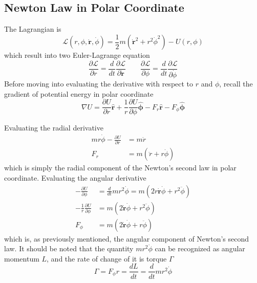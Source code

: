 \documentclass[../../../main.tex]{subfiles}
\begin{document}
\subsection{Newton Law in Polar Coordinate}
The Lagrangian is
\begin{equation*}
	\mathcal{L}(r,\phi,\dot{\mathbf{r}},\dot{\phi})=\frac{1}{2}m(\dot{\mathbf{r}}^2+r^2\dot{\phi}^2)-U(r,\phi)
\end{equation*}
which result into two Euler-Lagrange equation
\begin{equation*}
	\frac{\partial\mathcal{L}}{\partial r}=\frac{d}{dt}\frac{\partial\mathcal{L}}{\partial \dot{\mathbf{r}}}\qquad\frac{\partial\mathcal{L}}{\partial \phi}=\frac{d}{dt}\frac{\partial\mathcal{L}}{\partial \dot{\phi}}
\end{equation*}
Before moving into evaluating the derivative with respect to $r$ and $\phi$, recall the gradient of potential energy in polar coordinate
\begin{equation*}
	\nabla U=\frac{\partial U}{\partial r}\mathbf{\hat{{r}}}+ \frac{1}{r}\frac{\partial U}{\partial \phi}\boldsymbol{\hat{\phi}}-F_r\mathbf{\hat{r}}-F_{\phi}\boldsymbol{\hat{\phi}}
\end{equation*}

Evaluating the radial derivative
\begin{align*}
	mr\dot{\phi}-\frac{\partial U}{\partial r} & =m\ddot{r}               \\
	F_r                                        & =m(\ddot{r}+r\dot{\phi})
\end{align*}
which is simply the radial component of the Newton's second law in polar coordinate.
Evaluating the angular derivative
\begin{align*}
	-\frac{\partial U}{\partial \phi}            & =\frac{d}{dt}mr^2\dot{\phi}=m(2r\dot{\mathbf{r}}\dot{\phi}+r^2\ddot{\phi}) \\
	-\frac{1}{r}\frac{\partial U}{\partial \phi} & =m(2\dot{\mathbf{r}}\dot{\phi}+r^2\ddot{\phi})                             \\
	F_\phi                                       & =m(2\dot{\mathbf{r}}\dot{\phi}+r\ddot{\phi})
\end{align*}
which is, as previously mentioned, the angular component of Newton's second law. It should be noted that the quantity $mr^2\dot{\phi}$ can be recognized as angular momentum $L$, and the rate of change of it is torque $\Gamma$
\begin{equation*}
	\Gamma=F_\phi r=\frac{dL}{dt}=\frac{d}{dt}mr^2\dot{\phi}
\end{equation*}
\end{document}
